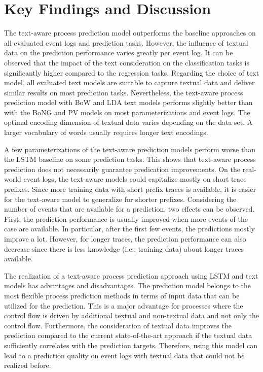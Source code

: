 \section{Key Findings and Discussion}

The text-aware process prediction model outperforms the baseline approaches on all evaluated event logs and prediction tasks.
However, the influence of textual data on the prediction performance varies greatly per event log.
It can be observed that the impact of the text consideration on the classification tasks is significantly higher compared to the regression tasks.
Regarding the choice of text model, all evaluated text models are suitable to capture textual data and deliver similar results on most prediction tasks.
Nevertheless, the text-aware process prediction model with BoW and LDA text models performs slightly better than with the BoNG and PV models on most parameterizations and event logs.
The optimal encoding dimension of textual data varies depending on the data set.
A larger vocabulary of words usually requires longer text encodings.

A few parameterizations of the text-aware prediction models perform worse than the LSTM baseline on some prediction tasks.
This shows that text-aware process prediction does not necessarily guarantee predication improvements.
On the real-world event logs, the text-aware models could capitalize mostly on short trace prefixes.
Since more training data with short prefix traces is available, it is easier for the text-aware model to generalize for shorter prefixes.
Considering the number of events that are available for a prediction, two effects can be observed.
First, the prediction performance is usually improved when more events of the case are available.
In particular, after the first few events, the predictions mostly improve a lot.
However, for longer traces, the prediction performance can also decrease since there is less knowledge (i.e., training data) about longer traces available.

The realization of a text-aware process prediction approach using LSTM and text models has advantages and disadvantages.
The prediction model belongs to the most flexible process prediction methods in terms of input data that can be utilized for the prediction.
This is a major advantage for processes where the control flow is driven by additional textual and non-textual data and not only the control flow.
Furthermore, the consideration of textual data improves the prediction compared to the current state-of-the-art approach if the textual data sufficiently correlates with the prediction targets.
Therefore, using this model can lead to a prediction quality on event logs with textual data that could not be realized before.

